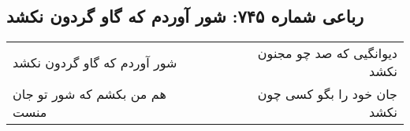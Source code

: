 \begin{center}
\section*{رباعی شماره ۷۴۵: شور آوردم که گاو گردون نکشد}
\label{sec:0745}
\begin{longtable}{l p{0.5cm} r}
شور آوردم که گاو گردون نکشد
&&
دیوانگیی که صد چو مجنون نکشد
\\
هم من بکشم که شور تو جان منست
&&
جان خود را بگو کسی چون نکشد
\\
\end{longtable}
\end{center}
